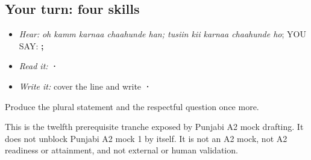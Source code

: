 \subsection*{Your turn: four skills}
\begin{itemize}
\raggedright
  \item \emph{Hear:} \emph{oh kamm karnaa chaahunde han; tusiin kii karnaa chaahunde ho}; YOU SAY: \textbf{    ;     }
  \item \emph{Read it:} \textbf{     ·     }
  \item \emph{Write it:} cover the line and write \textbf{  ·  }
\end{itemize}

\begin{tcolorbox}[breakable,colback=teal!4,colframe=teal!35!black,title={Before you move on}]
Produce the plural statement and the respectful question once more.

This is the twelfth prerequisite tranche exposed by Punjabi A2 mock drafting. It does not unblock Punjabi A2 mock 1 by itself. It is not an A2 mock, not A2 readiness or attainment, and not external or human validation.
\end{tcolorbox}
